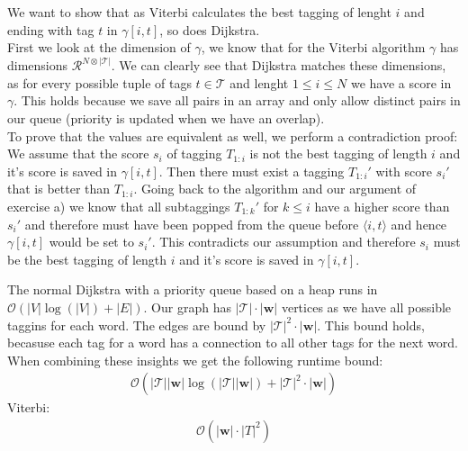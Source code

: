 \documentclass[a4paper,12pt]{ETHexercise}
\begin{document}
\begin{question}
\begin{subquestion}
	\end{subquestion}
	\begin{subquestion}
		We want to show that as Viterbi calculates the best tagging of lenght $i$ and ending with tag $t$ in $\gamma[i, t]$, so does Dijkstra.\\
		First we look at the dimension of $\gamma$, we know that for the Viterbi algorithm $\gamma$ has dimensions $\mathcal{R}^{N \otimes |\mathcal{T}|}$. We can clearly see that Dijkstra matches these dimensions, as for every possible tuple of tags $t \in \mathcal{T}$ and lenght $1 \leq i \leq N$ we have a score in $\gamma$. This holds because we save all pairs in an array and only allow distinct pairs in our queue (priority is updated when we have an overlap).\\
		To prove that the values are equivalent as well, we perform a contradiction proof:\\
		We assume that the score $s_{i}$ of tagging $T_{1:i}$ is not the best tagging of length $i$ and it's score is saved in $\gamma[i, t]$. Then there must exist a tagging $T_{1:i}'$ with score $s_{i}'$ that is better than $T_{1:i}$. Going back to the algorithm and our argument of exercise a) we know that all subtaggings $T_{1:k}'$ for $k \leq i$ have a higher score than $s_{i}'$ and therefore must have been popped from the queue before $\langle i, t \rangle$ and hence $\gamma[i, t]$ would be set to $s_{i}'$. This contradicts our assumption and therefore $s_{i}$ must be the best tagging of length $i$ and it's score is saved in $\gamma[i, t]$.
	\end{subquestion}
	\begin{subquestion}
		The normal Dijkstra with a priority queue based on a heap runs in $\mathcal{O}(|V| \log(|V|) + |E|)$. Our graph has $|\mathcal{T}| \cdot |\mathbf{w}|$ vertices as we have all possible taggins for each word. The edges are bound by $|\mathcal{T}|^2 \cdot |\mathbf{w}|$. This bound holds, becasuse each tag for a word has a connection to all other tags for the next word. When combining these insights we get the following runtime bound:
		\begin{align}
			\mathcal{O}(|\mathcal{T}||\mathbf{w}| \log(|\mathcal{T}||\mathbf{w}|) + |\mathcal{T}|^2 \cdot |\mathbf{w}|)
		\end{align}
		Viterbi:
		\begin{align}
			\mathcal{O}(|\mathbf{w}| \cdot |T|^2)
		\end{align}
	\end{subquestion}
	\begin{subquestion}

\end{subquestion}
\end{question}
\end{document}
